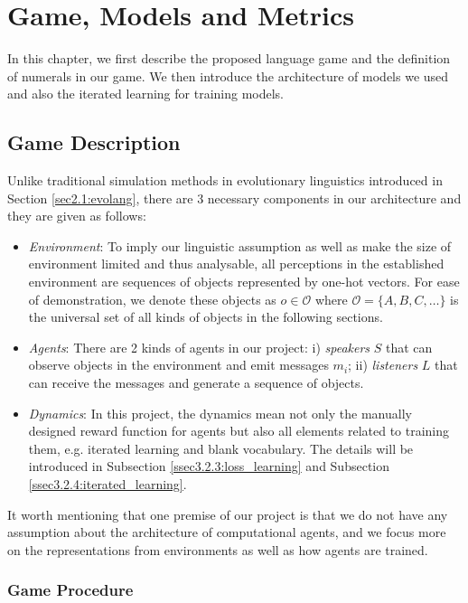 \chapter{Game, Models and Metrics}
\label{ch3:game_model}

In this chapter, we first describe the proposed language game and the definition of numerals in our game. We then introduce the architecture of models we used and also the iterated learning for training models.

\section{Game Description}
\label{sec3.1:game_description}

Unlike traditional simulation methods in evolutionary linguistics introduced in Section \ref{sec2.1:evolang}, there are 3 necessary components in our architecture and they are given as follows:

\begin{itemize}
  \item \textit{Environment}: To imply our linguistic assumption as well as make the size of environment limited and thus analysable, all perceptions in the established environment are sequences of objects represented by one-hot vectors. For ease of demonstration, we denote these objects as $o \in \mathcal{O}$ where $\mathcal{O} = \{A, B, C, \dots\}$ is the universal set of all kinds of objects in the following sections.
  \item \textit{Agents}: There are 2 kinds of agents in our project: i) \textit{speakers} $S$ that can observe objects in the environment and emit messages $m_i$; ii) \textit{listeners} $L$ that can receive the messages and generate a sequence of objects.
  \item \textit{Dynamics}: In this project, the dynamics mean not only the manually designed reward function for agents but also all elements related to training them, e.g. iterated learning and blank vocabulary. The details will be introduced in Subsection \ref{ssec3.2.3:loss_learning} and Subsection \ref{ssec3.2.4:iterated_learning}. 
\end{itemize}

It worth mentioning that one premise of our project is that we do not have any assumption about the architecture of computational agents, and we focus more on the representations from environments as well as how agents are trained.

\subsection{Game Procedure}
\label{ssec3.1.1:game_procedure}

